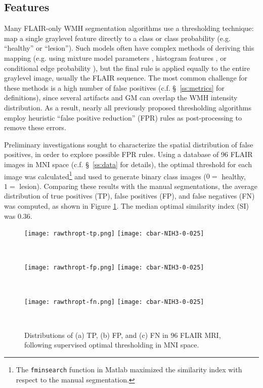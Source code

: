 \subsection{Features}
Many FLAIR-only WMH segmentation algorithms use a thresholding technique: map a single graylevel feature directly to a class or class probability (e.g. ``healthy'' or ``lesion''). Such models often have complex methods of deriving this mapping (e.g. using mixture model parameters \cite{Roura2015}, histogram features \cite{Yoo2014}, or conditional edge probability \cite{Knight2016}), but the final rule is applied equally to the entire graylevel image, usually the FLAIR sequence. The most common challenge for these methods is a high number of false positives (c.f. \S\ \ref{ss:metrics} for definitions), since several artifacts and GM can overlap the WMH intensity distribution. As a result, nearly all previously proposed thresholding algorithms employ heuristic ``false positive reduction'' (FPR) rules as post-processing to remove these errors.
\par
Preliminary investigations sought to characterize the spatial distribution of false positives, in order to explore possible FPR rules. Using a database of 96 FLAIR images in MNI space (c.f. \S\ \ref{ss:data} for details), the optimal threshold for each image was calculated\footnote{The \texttt{fminsearch} function in Matlab maximized the similarity index with respect to the manual segmentation.} and used to generate binary class images ($0 =$ healthy, $1 =$ lesion). Comparing these results with the manual segmentations, the average distribution of true positives (TP), false positives (FP), and false negatives (FN) was computed, as shown in Figure \ref{fig:thropt-tpfpfn}. The median optimal similarity index (SI) was 0.36.
\begin{figure}[h]
  \centering
  \begin{subfigureside}\texttt{[image: rawthropt-tp.png]} \texttt{[image: cbar-NIH3-0-025]}\end{subfigureside}\\[0.5em]
  \begin{subfigureside}\texttt{[image: rawthropt-fp.png]} \texttt{[image: cbar-NIH3-0-025]}\end{subfigureside}\\[0.5em]
  \begin{subfigureside}\texttt{[image: rawthropt-fn.png]} \texttt{[image: cbar-NIH3-0-025]}\end{subfigureside}\\[0.5em]
  \caption{Distributions of (a) TP, (b) FP, and (c) FN in 96 FLAIR MRI, following supervised optimal thresholding in MNI space.}
  \label{fig:thropt-tpfpfn}
\end{figure}
